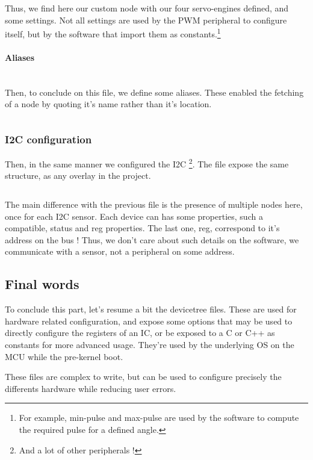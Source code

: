 \inputminted[linenos, firstline=52, lastline=66]{devicetree}{\DeviceTree/topaze-pwm-servo.dtsi}

Thus, we find here our custom node with our four servo-engines defined, and
some settings. Not all settings are used by the PWM peripheral to configure
itself, but by the software that import them as constants.\footnote{ For
    example, min-pulse and max-pulse are used by the software to compute the
    required pulse for a defined angle. }

\paragraph{Aliases} ~\\
Then, to conclude on this file, we define some aliases. These enabled the fetching of a node by quoting
it's name rather than it's location.

\inputminted[linenos, firstline=69, lastline=74]{devicetree}{\DeviceTree/topaze-pwm-servo.dtsi}

\subsubsection{I2C configuration}
Then, in the same manner we configured the I2C \footnote{ And a lot of other
    peripherals ! }. The file expose the same structure, as any overlay in the
project.

\inputminted[linenos, firstline=36, lastline=61]{devicetree}{\DeviceTree/topaze-I2C.dtsi}

The main difference with the previous file is the presence of multiple nodes
here, once for each I2C sensor. Each device can has some properties, such a
compatible, status and reg properties. The last one, reg, correspond to it's
address on the bus ! Thus, we don't care about such details on the software, we
communicate with a sensor, not a peripheral on some address.

\subsection{Final words}
To conclude this part, let's resume a bit the devicetree files. These are used
for hardware related configuration, and expose some options that may be used to
directly configure the registers of an IC, or be exposed to a C or C++ as
constants for more advanced usage. They're used by the underlying OS on the MCU
while the pre-kernel boot.

These files are complex to write, but can be used to configure precisely the
differents hardware while reducing user errors.
